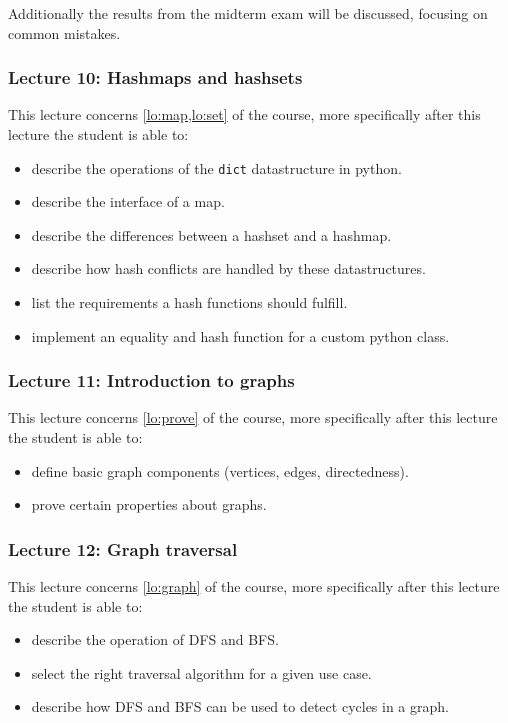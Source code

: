 Additionally the results from the midterm exam will be discussed, focusing on common mistakes.

\subsubsection*{Lecture 10: Hashmaps and hashsets}
\label{sub:lecture_10}

This lecture concerns \cref{lo:map,lo:set} of the course, more specifically after this lecture the student is able
to:
\begin{itemize}
	\item describe the operations of the \texttt{dict} datastructure in python.
	\item describe the interface of a map.
	\item describe the differences between a hashset and a hashmap.
	\item describe how hash conflicts are handled by these datastructures.
	\item list the requirements a hash functions should fulfill.
	\item implement an equality and hash function for a custom python class.
\end{itemize}


\subsubsection*{Lecture 11: Introduction to graphs}
\label{sub:lecture_11}

This lecture concerns \cref{lo:prove} of the course, more specifically after this lecture the student is able
to:
\begin{itemize}
	\item define basic graph components (vertices, edges, directedness).
	\item prove certain properties about graphs.
\end{itemize}

\subsubsection*{Lecture 12: Graph traversal}
\label{sub:lecture_12}

This lecture concerns \cref{lo:graph} of the course, more specifically after this lecture the student is able
to:
\begin{itemize}
	\item describe the operation of DFS and BFS.
	\item select the right traversal algorithm for a given use case.
	\item describe how DFS and BFS can be used to detect cycles in a graph.
\end{itemize}

